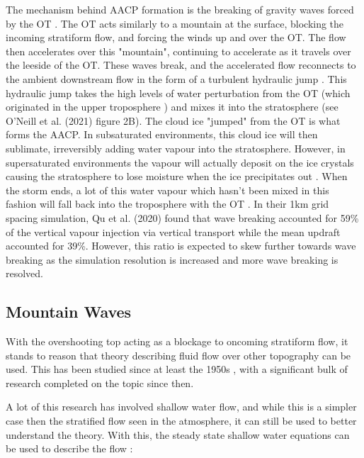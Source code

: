 \documentclass[12pt]{article}
\begin{document}
The mechanism behind AACP formation is the breaking of gravity waves forced by the OT \cite{oneill_hydraulic_2021} \cite{dauhut_mechanisms_2018} \cite{wang_moisture_2003} \cite{hassim_model_2010} \cite{qu_simulation_2020}. The OT acts similarly to a mountain at the surface, blocking the incoming stratiform flow, and forcing the winds up and over the OT. The flow then accelerates over this "mountain", continuing to accelerate as it travels over the leeside of the OT. These waves break, and the accelerated flow reconnects to the ambient downstream flow in the form of a turbulent hydraulic jump \cite{oneill_hydraulic_2021}. This hydraulic jump takes the high levels of water perturbation from the OT (which originated in the upper troposphere \cite{hassim_model_2010}) and mixes it into the stratosphere (see O'Neill et al. (2021) \cite{oneill_hydraulic_2021} figure 2B). The cloud ice "jumped" from the OT is what forms the AACP. In subsaturated environments, this cloud ice will then sublimate, irreversibly adding water vapour into the stratosphere. However, in supersaturated environments the vapour will actually deposit on the ice crystals causing the stratosphere to lose moisture when the ice precipitates out \cite{hassim_model_2010}. When the storm ends, a lot of this water vapour which hasn't been mixed in this fashion will fall back into the troposphere with the OT \cite{wang_convectively_2023}. In their 1km grid spacing simulation, Qu et al. (2020) \cite{qu_simulation_2020} found that wave breaking accounted for 59\% of the vertical vapour injection via vertical transport while the mean updraft accounted for 39\%. However, this ratio is expected to skew further towards wave breaking as the simulation resolution is increased and more wave breaking is resolved.

\subsection{Mountain Waves}

With the overshooting top acting as a blockage to oncoming stratiform flow, it stands to reason that theory describing fluid flow over other topography can be used. This has been studied since at least the 1950s \cite{long_aspects_1955}, with a significant bulk of research completed on the topic since then. 

A lot of this research has involved shallow water flow, and while this is a simpler case then the stratified flow seen in the atmosphere, it can still be used to better understand the theory. With this, the steady state shallow water equations can be used to describe the flow \cite{durran_mountain_1990}:
\end{document}
